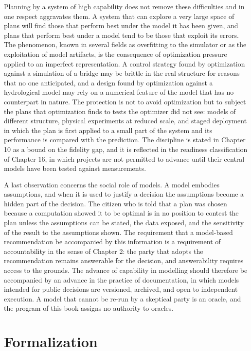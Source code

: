 Planning by a system of high capability does not remove these difficulties and in one respect aggravates them. A system that can explore a very large space of plans will find those that perform best under the model it has been given, and plans that perform best under a model tend to be those that exploit its errors. The phenomenon, known in several fields as overfitting to the simulator or as the exploitation of model artifacts, is the consequence of optimization pressure applied to an imperfect representation. A control strategy found by optimization against a simulation of a bridge may be brittle in the real structure for reasons that no one anticipated, and a design found by optimization against a hydrological model may rely on a numerical feature of the model that has no counterpart in nature. The protection is not to avoid optimization but to subject the plans that optimization finds to tests the optimizer did not see: models of different structure, physical experiments at reduced scale, and staged deployment in which the plan is first applied to a small part of the system and its performance is compared with the prediction. The discipline is stated in Chapter 10 as a bound on the fidelity gap, and it is reflected in the readiness classification of Chapter 16, in which projects are not permitted to advance until their central models have been tested against measurements.

A last observation concerns the social role of models. A model embodies assumptions, and when it is used to justify a decision the assumptions become a hidden part of the decision. The citizen who is told that a plan was chosen because a computation showed it to be optimal is in no position to contest the plan unless the assumptions can be stated, the data exposed, and the sensitivity of the result to the assumptions shown. The requirement that a model-based recommendation be accompanied by this information is a requirement of accountability in the sense of Chapter 2: the party that adopts the recommendation remains answerable for the decision, and answerability requires access to the grounds. The advance of capability in modelling should therefore be accompanied by an advance in the practice of documentation, in which models intended for public decisions are versioned, archived, and open to independent execution. A model that cannot be re-run by a skeptical party is an oracle, and the program of this book assigns no authority to oracles.

\section*{Formalization}

